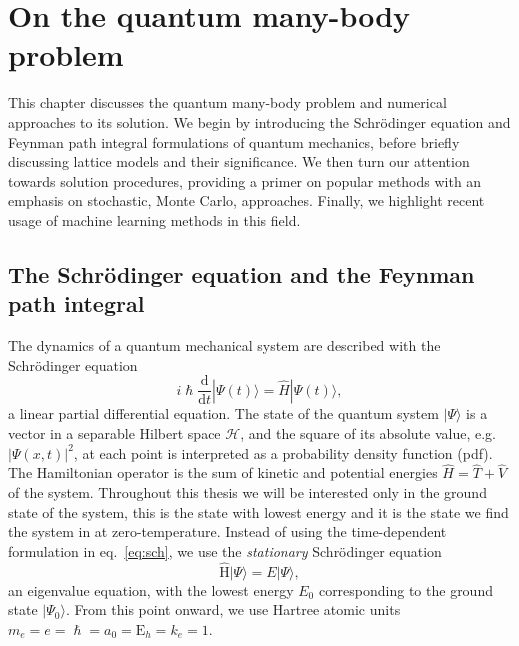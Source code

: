 
\chapter{On the quantum many-body problem}
\label{chapter2}
This chapter discusses the quantum many-body problem and numerical approaches to its solution. We begin by introducing the Schr\" odinger equation and Feynman path integral formulations of quantum mechanics, before briefly discussing lattice models and their significance. We then turn our attention towards solution procedures, providing a primer on popular methods with an emphasis on stochastic, Monte Carlo, approaches. Finally, we highlight recent usage of machine learning methods in this field.

\ifpdf
    \graphicspath{{Chapter2/Figs/Raster/}{Chapter2/Figs/PDF/}{Chapter2/Figs/}}
\else
    \graphicspath{{Chapter2/Figs/Vector/}{Chapter2/Figs/}}
\fi

\section{The Schr{\"o}dinger equation and the Feynman path integral}
\label{subsec:latt-qm}
The dynamics of a quantum mechanical system are described with the Schr\" odinger equation
\begin{equation}
\label{eq:sch}
i \hslash \frac{\mathrm{d}}{\mathrm{d} t}|\Psi(t)\rangle=\hat{H}|\Psi(t)\rangle,
\end{equation}
a linear partial differential equation. The state of the quantum system $| \Psi \rangle$ is a vector in a separable Hilbert space $\mathcal{H}$, and the square of its absolute value, e.g. $|\Psi(x, t)|^2$, at each point is interpreted as a probability density function (pdf). The Hamiltonian operator is the sum of kinetic and potential energies $\hat H = \hat T + \hat V$ of the system. Throughout this thesis we will be interested only in the ground state of the system, this is the state with lowest energy and it is the state we find the system in at zero-temperature. Instead of using the time-dependent formulation in eq.~\eqref{eq:sch}, we use the \emph{stationary} Schr\" odinger equation
\begin{equation}
\hat{\mathrm{H}}|\Psi\rangle=E|\Psi\rangle,
\end{equation}
an eigenvalue equation, with the lowest energy $E_0$ corresponding to the ground state $|\Psi_{0}\rangle$. From this point onward, we use Hartree atomic units $m_{e}=e=\hslash=a_{0}=\mathrm{E}_{h}=k_{e}=1$.

